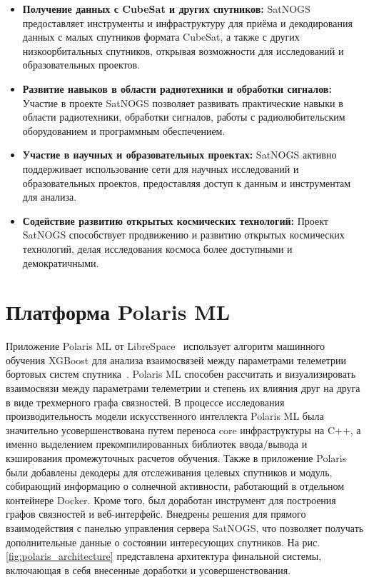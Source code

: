 \documentclass[14pt, a4paper]{extreport}
\begin{document}
    \begin{itemize}
        \item \textbf{Получение данных с CubeSat и других спутников:} SatNOGS предоставляет инструменты и инфраструктуру для приёма и декодирования данных с малых спутников формата CubeSat, а также с других низкоорбитальных спутников,  открывая возможности для исследований и образовательных проектов.
        \item \textbf{Развитие навыков в области радиотехники и обработки сигналов:} Участие в проекте SatNOGS позволяет развивать практические навыки в области радиотехники, обработки сигналов, работы с радиолюбительским оборудованием и программным обеспечением.
        \item \textbf{Участие в научных и образовательных проектах:} SatNOGS активно поддерживает использование сети для научных исследований и образовательных проектов, предоставляя доступ к данным и инструментам для анализа.
        \item \textbf{Содействие развитию открытых космических технологий:} Проект SatNOGS способствует продвижению и развитию открытых космических технологий, делая исследования космоса более доступными и демократичными.
    \end{itemize}

    \newpage


    \section{Платформа Polaris ML}

    Приложение Polaris ML от LibreSpace~\cite{librespace_docs} использует алгоритм машинного обучения XGBoost для анализа взаимосвязей между параметрами телеметрии бортовых систем спутника~\cite{ray_2002_bayesian}.
    Polaris ML способен рассчитать и визуализировать взаимосвязи между параметрами телеметрии и степень их влияния друг на друга в виде трехмерного графа связностей.
    В процессе исследования производительность модели искусственного интеллекта Polaris ML была значительно усовершенствована путем переноса core инфраструктуры на C++, а именно выделением прекомпилированных библиотек ввода/вывода и кэширования промежуточных расчетов обучения.
    Также в приложение Polaris были добавлены декодеры для отслеживания целевых спутников и модуль, собирающий информацию о солнечной активности, работающий в отдельном контейнере Docker.
    Кроме того, был доработан инструмент для построения графов связностей и веб-интерфейс.
    Внедрены решения для прямого взаимодействия с панелью управления сервера SatNOGS, что позволяет получать дополнительные данные о состоянии интересующих спутников.
    На рис. \ref{fig:polaris_architecture} представлена архитектура финальной системы, включающая в себя внесенные доработки и усовершенствования.
\end{document}
